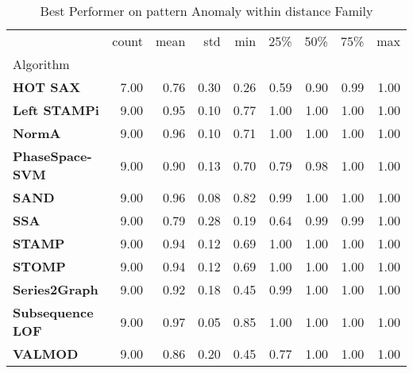 \begin{table}
\caption{Best Performer on pattern Anomaly within distance Family}
\label{tab:bp-pattern_distance}
\begin{tabular}{lrrrrrrrr}
\toprule
 & count & mean & std & min & 25\% & 50\% & 75\% & max \\
Algorithm &  &  &  &  &  &  &  &  \\
\midrule
\textbf{HOT SAX} & 7.00 & 0.76 & 0.30 & 0.26 & 0.59 & 0.90 & 0.99 & 1.00 \\
\textbf{Left STAMPi} & 9.00 & 0.95 & 0.10 & 0.77 & 1.00 & 1.00 & 1.00 & 1.00 \\
\textbf{NormA} & 9.00 & 0.96 & 0.10 & 0.71 & 1.00 & 1.00 & 1.00 & 1.00 \\
\textbf{PhaseSpace-SVM} & 9.00 & 0.90 & 0.13 & 0.70 & 0.79 & 0.98 & 1.00 & 1.00 \\
\textbf{SAND} & 9.00 & 0.96 & 0.08 & 0.82 & 0.99 & 1.00 & 1.00 & 1.00 \\
\textbf{SSA} & 9.00 & 0.79 & 0.28 & 0.19 & 0.64 & 0.99 & 0.99 & 1.00 \\
\textbf{STAMP} & 9.00 & 0.94 & 0.12 & 0.69 & 1.00 & 1.00 & 1.00 & 1.00 \\
\textbf{STOMP} & 9.00 & 0.94 & 0.12 & 0.69 & 1.00 & 1.00 & 1.00 & 1.00 \\
\textbf{Series2Graph} & 9.00 & 0.92 & 0.18 & 0.45 & 0.99 & 1.00 & 1.00 & 1.00 \\
\textbf{Subsequence LOF} & 9.00 & 0.97 & 0.05 & 0.85 & 1.00 & 1.00 & 1.00 & 1.00 \\
\textbf{VALMOD} & 9.00 & 0.86 & 0.20 & 0.45 & 0.77 & 1.00 & 1.00 & 1.00 \\
\bottomrule
\end{tabular}
\end{table}
